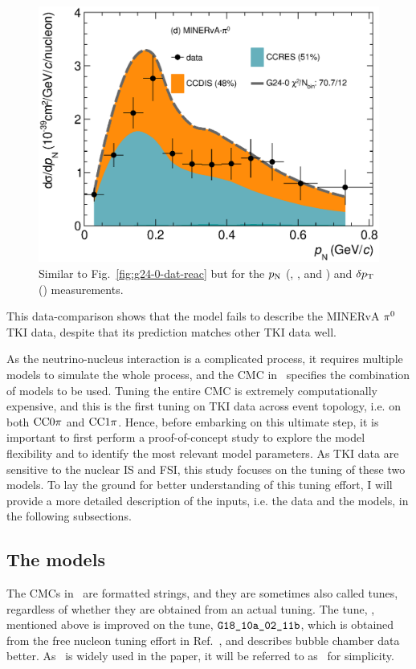 \begin{figure}
    \includegraphics[width=\dbfigwid\textwidth]{figures/tuning/0000-min_pi0_pn_reac_decomp.eps}
    \caption{\label{fig:g24-0-pn-reac} Similar to Fig.~\ref{fig:g24-0-dat-reac} but for the $p_\textrm{N}$ (\ttkpip, \minzpi, and \minpiz) and $\delta p_\textrm{T}$ (\ttkzpi) measurements.
    } 
\end{figure}
This data-comparison shows that the model fails to describe the MINERvA $\pi^0$ TKI data, despite that its prediction matches other TKI data well.

As the neutrino-nucleus interaction is a complicated process, it requires multiple models to simulate the whole process, and the CMC in \genie\ specifies the combination of models to be used.
Tuning the entire CMC is extremely computationally expensive, and this is the first tuning on TKI data across event topology, i.e. on both $\textrm{CC}0\pi$ and $\textrm{CC}1\pi$. 
Hence, before embarking on this ultimate step, it is important to first perform a proof-of-concept study to explore the model flexibility and to identify the most relevant model parameters.
As TKI data are sensitive to the nuclear IS and FSI, this study focuses on the tuning of these two models.
To lay the ground for better understanding of this tuning effort, I will provide a more detailed description of the inputs, i.e. the data and the models, in the following subsections. 

\subsection{The models}
\label{sec:tuning-para-choice}
    The CMCs in \genie\ are formatted strings, and they are sometimes also called tunes, regardless of whether they are obtained from an actual tuning.
    The tune, \newtune, mentioned above is improved on the tune, $\texttt{G18\_10a\_02\_11b}$, which is obtained from the free nucleon tuning effort in Ref.~\cite{GENIE:2021zuu}, and describes bubble chamber data better.
    As \newtune\ is widely used in the paper, it will be referred to as \gZero\ for simplicity. 

